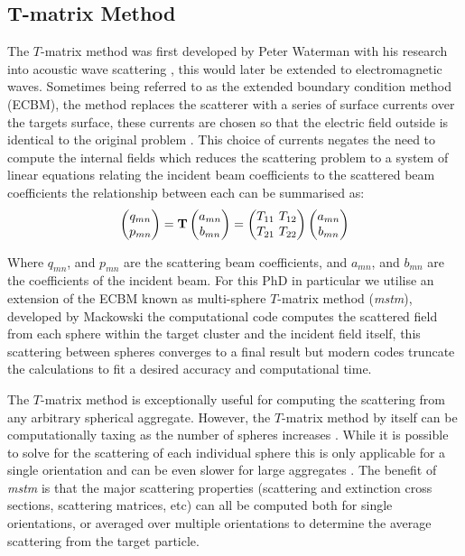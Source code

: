 \subsection{T-matrix Method}
The $T$-matrix method was first developed by Peter Waterman with his
research into acoustic wave scattering \cite{Waterman1969}, this 
would later be extended to electromagnetic waves. Sometimes being 
referred to as the extended boundary condition method (ECBM), 
the method replaces the scatterer with a series of surface currents
over the targets surface, these currents are chosen so that the
electric field outside is identical to the original problem \cite{Wriedt1998}. 
This choice of currents negates the need to compute the internal fields
which reduces the scattering problem to a system of linear equations 
relating the incident beam coefficients to the scattered beam coefficients
the relationship between each can be summarised as:
\begin{align}
	\begin{pmatrix}
		q_{mn} \\
		p_{mn} 
	\end{pmatrix}
	= \bold{T} 
	\begin{pmatrix}
		a_{mn} \\
		b_{mn}
	\end{pmatrix}
	= \begin{pmatrix}
		T_{11} \ T_{12} \\
		T_{21} \ T_{22}
	\end{pmatrix}
	\begin{pmatrix}
		a_{mn} \\
		b_{mn}
	\end{pmatrix}
\end{align}

Where $q_{mn}$, and $p_{mn}$ are the scattering beam coefficients, and
$a_{mn}$, and $b_{mn}$ are the coefficients of the incident beam. For 
this PhD in particular we utilise an extension of the ECBM known 
as multi-sphere $T$-matrix method (\textit{mstm}), developed by Mackowski
\cite{Mackowski2011} the computational code computes the scattered field 
from each sphere within the target cluster and the incident field itself, 
this scattering between spheres converges to a final result but modern codes 
truncate the calculations to fit a desired accuracy and computational time.

The $T$-matrix method is exceptionally useful for computing the scattering 
from any arbitrary spherical aggregate. However, the $T$-matrix method by 
itself can be computationally taxing as the number of spheres increases 
\cite{Mackowski2011}. While it is possible to solve for the scattering of
each individual sphere this is only applicable for a single orientation and 
can be even slower for large aggregates \cite{Mackowski1996, Xu1995}. The 
benefit of \textit{mstm} is that the major scattering properties (scattering 
and extinction cross sections, scattering matrices, etc) can all be computed 
both for single orientations, or averaged over multiple orientations to determine
the average scattering from the target particle. 

